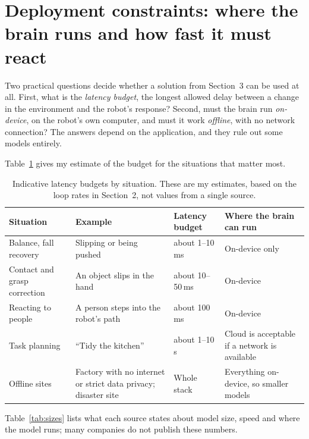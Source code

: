 \documentclass[11pt,a4paper]{article}
\begin{document}
\section{Deployment constraints: where the brain runs and how fast it must react}\label{sec:deploy}

Two practical questions decide whether a solution from Section~3 can be used at
all.  First, what is the \emph{latency budget}, the longest allowed delay
between a change in the environment and the robot's response?  Second, must
the brain run \emph{on-device}, on the robot's own computer, and must it work
\emph{offline}, with no network connection?  The answers depend on the
application, and they rule out some models entirely.

Table~\ref{tab:budget} gives my estimate of the budget for the situations that
matter most.


\begin{table}[H]
\centering\small
\renewcommand{\arraystretch}{1.25}
\begin{tabularx}{\textwidth}{>{\raggedright\arraybackslash}p{3.0cm}
  >{\raggedright\arraybackslash}X >{\raggedright\arraybackslash}p{2.4cm}
  >{\raggedright\arraybackslash}p{3.6cm}}
\toprule
Situation & Example & Latency budget & Where the brain can run \\
\midrule
Balance, fall recovery & Slipping or being pushed & about 1--10\,ms &
On-device only \\
Contact and grasp correction & An object slips in the hand & about
10--50\,ms & On-device \\
Reacting to people & A person steps into the robot's path & about
100\,ms & On-device \\
Task planning & ``Tidy the kitchen'' & about 1--10\,s & Cloud is acceptable
if a network is available \\
Offline sites & Factory with no internet or strict data privacy; disaster
site & Whole stack & Everything on-device, so smaller models \\
\bottomrule
\end{tabularx}
\caption{Indicative latency budgets by situation.  These are my estimates,
based on the loop rates in Section~2, not values from a single source.}
\label{tab:budget}
\end{table}

Table~\ref{tab:sizes} lists what each source states about model size, speed
and where the model runs; many companies do not publish these numbers.
\end{document}
